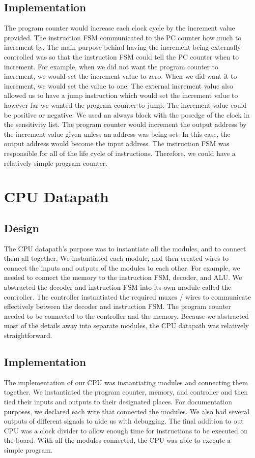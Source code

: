 \documentclass[letterpaper, 11 pt, conference]{article}
\begin{document}
\subsection{Implementation}
The program counter would increase each clock cycle by the increment value provided. The instruction FSM communicated to the PC counter how much to increment by. The main purpose behind having the increment being externally controlled was so that the instruction FSM could tell the PC counter when to increment. For example, when we did not want the program counter to increment, we would set the increment value to zero. When we did want it to increment, we would set the value to one. The external increment value also allowed us to have a jump instruction which would set the increment value to however far we wanted the program counter to jump. The increment value could be positive or negative. We used an always block with the posedge of the clock in the sensitivity list. The program counter would increment the output address by the increment value given unless an address was being set. In this case, the output address would become the input address. The instruction FSM was responsible for all of the life cycle of instructions. Therefore, we could have a relatively simple program counter.


\section{CPU Datapath}
\subsection{Design}
The CPU datapath’s purpose was to instantiate all the modules, and to connect them all together. We instantiated each module, and then created wires to connect the inputs and outputs of the modules to each other. For example, we needed to connect the memory to the instruction FSM, decoder, and ALU. We abstracted the decoder and instruction FSM into its own module called the controller. The controller instantiated the required muxes / wires to communicate effectively between the decoder and instruction FSM.  The program counter needed to be connected to the controller and the memory. Because we abstracted most of the details away into separate modules, the CPU datapath was relatively straightforward. 

\subsection{Implementation}
The implementation of our CPU was instantiating modules and connecting them together. We instantiated the program counter, memory, and controller and then tied their inputs and outputs to their designated places. For documentation purposes, we declared each wire that connected the modules. We also had several outputs of different signals to aide us with debugging. The final addition to out CPU was a clock divider to allow enough time for instructions to be executed on the board. With all the modules connected, the CPU was able to execute a simple program.
\end{document}
